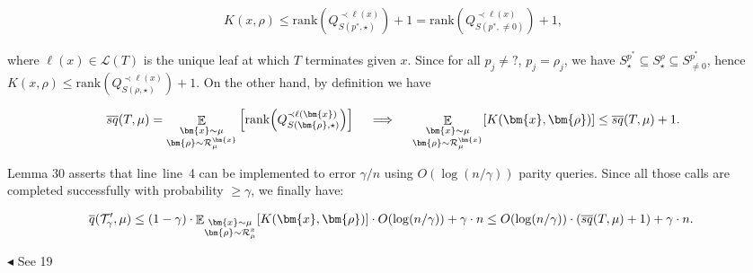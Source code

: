 \[\begin{gathered}
K(x,\rho)\leq\mathrm{rank}\left(Q^{\prec\ell(x)}_{S(p^{*},\star)}\right)+1=\mathrm{rank}\left(Q^{\prec\ell(x)}_{S(p^{*},\neq 0)}\right)+1,
\end{gathered}\]


where $\ell(x)\in\mathcal{L}(T)$ is the unique leaf at which $T$ terminates given $x$. Since for all $p_{j}\neq?$, $p_{j}=\rho_{j}$, we have $S^{p^{*}}_{\star}\subseteq S^{\rho}_{\star}\subseteq S^{p^{*}}_{\neq 0}$, hence $K(x,\rho)\leq\mathrm{rank}(Q^{\prec\ell(x)}_{S(\rho,\star)})+1$.
On the other hand, by definition we have\par


\[\begin{gathered}
\mathop{\overline{sq}}(T,\mu)=\mathop{\mathbb{E}}_{\begin{subarray}{c}\bm{x}\sim\mu\\
\bm{\rho}\sim\mathcal{R}_{\mu}^{\bm{x}}\end{subarray}}\Big{[}\mathrm{rank}\Big{(}Q^{\prec\ell(\bm{x})}_{S(\bm{\rho},\star)}\Big{)}\Big{]}\quad\implies\quad\mathop{\mathbb{E}}_{\begin{subarray}{c}\bm{x}\sim\mu\\
\bm{\rho}\sim\mathcal{R}_{\mu}^{\bm{x}}\end{subarray}}[K(\bm{x},\bm{\rho})]\leq\mathop{\overline{sq}}(T,\mu)+1.
\end{gathered}\]


Lemma 30 asserts that line line 4 can be implemented to error $\gamma/n$ using $O(\log(n/\gamma))$ parity queries. Since all those calls are completed successfully with probability $\geq\gamma$, we finally have:\par


\[\begin{gathered}
\overline{q}(\mathcal{T}^{\prime}_{\gamma},\mu)\leq(1-\gamma)\cdot\mathop{\mathbb{E}}\nolimits_{\begin{subarray}{c}\bm{x}\sim\mu\\
\bm{\rho}\sim\mathcal{R}_{\mu}^{x}\end{subarray}}[K(\bm{x},\bm{\rho})]\cdot O(\log(n/\gamma))+\gamma\cdot n\leq O(\log(n/\gamma))\cdot(\mathop{\overline{sq}}(T,\mu)+1)+\gamma\cdot n.\
\end{gathered}\]


$\blacktriangleleft$
See 19\par





